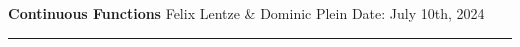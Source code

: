 \documentclass[10pt,a4paper,usenglish]{article}
\newcommand{\subject}{Continuous Functions}
\newcommand{\authors}{Felix Lentze \& Dominic Plein}
\newcommand{\experimentdate}{July 10th, 2024}
\begin{document}
\setlength{\abovedisplayskip}{0.2em}

\thispagestyle{plain} %

\vspace*{-2cm}

\begin{FlushLeft}
    \LARGE \textbf{\subject} \vspace{1mm}\linebreak
    \normalsize	\authors \vspace{1mm}\linebreak
    \small Date: \experimentdate

    \textcolor{heidelberg-red}{\rule{\linewidth}{1mm}}
\end{FlushLeft}

\tableofcontents
\pagebreak

\pagebreak

\end{document}
